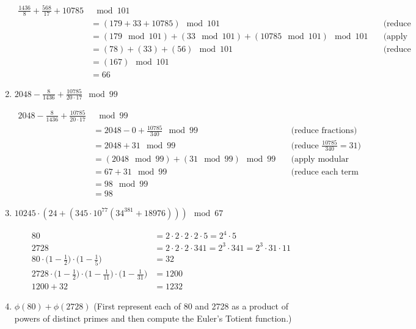 \documentclass[12pt]{article}
\begin{document}
\begin{enumerate}
    \[
\begin{aligned}
    \frac{1436}{8} + \frac{568}{17} + 10785 &\mod 101 \\
    &= (179 + 33 + 10785) \mod 101 \quad &\text{(reduce fractions)} \\
    &= (179 \mod 101) + (33 \mod 101) + (10785 \mod 101) \mod 101 \quad &\text{(apply modular addition)} \\
    &= (78) + (33) + (56) \mod 101 \quad &\text{(reduce each term mod 101)} \\
    &= (167) \mod 101 \\
    &= 66
\end{aligned}
\]
    \item $2048 - \frac{8}{1436} + \frac{10785}{20 \cdot 17} \mod 99$
    
\[
\begin{aligned}
    2048 - \frac{8}{1436} + \frac{10785}{20 \cdot 17} &\mod 99 \\
    &= 2048 - 0 + \frac{10785}{340} \mod 99 \quad &\text{(reduce fractions)} \\
    &= 2048 + 31 \mod 99 \quad &\text{(reduce \(\frac{10785}{340} = 31\))} \\
    &= (2048 \mod 99) + (31 \mod 99) \mod 99 \quad &\text{(apply modular addition)} \\
    &= 67 + 31 \mod 99 \quad &\text{(reduce each term mod 99)} \\
    &= 98 \mod 99 \\
    &= 98
\end{aligned}
\]

    \item $10245 \cdot (24 + (345 \cdot 10^{77} (34^{381} + 18976))) \mod 67$

    \[
\begin{aligned}
    80 &= 2 \cdot 2 \cdot 2 \cdot 2 \cdot 5 = 2^4 \cdot 5 \\
    2728 &= 2 \cdot 2 \cdot 2 \cdot 341 = 2^3 \cdot 341 = 2^3 \cdot 31 \cdot 11 \\
    80 \cdot \Big(1 - \frac{1}{2}\Big) \cdot \Big(1 - \frac{1}{5}\Big) &= 32 \\
    2728 \cdot \Big(1 - \frac{1}{2}\Big) \cdot \Big(1 - \frac{1}{11}\Big) \cdot \Big(1 - \frac{1}{31}\Big) &= 1200 \\
    1200 + 32 &= 1232
\end{aligned}
\]
    
    \item $\phi(80) + \phi(2728)$ (First represent each of 80 and 2728 as a product of powers of distinct primes and then compute the Euler's Totient function.)
\end{enumerate}
\end{document}
